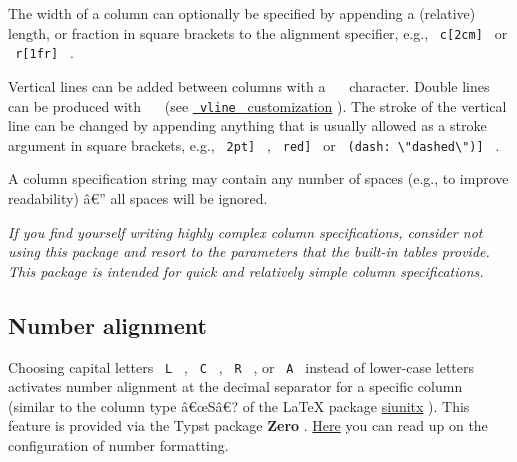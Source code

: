 The width of a column can optionally be specified by appending a
(relative) length, or fraction in square brackets to the alignment
specifier, e.g., \texttt{\ c{[}2cm{]}\ } or \texttt{\ r{[}1fr{]}\ } .

Vertical lines can be added between columns with a
\texttt{\ \textbar{}\ } character. Double lines can be produced with
\texttt{\ \textbar{}\textbar{}\ } (see
\href{https://github.com/typst/packages/raw/main/packages/preview/pillar/0.2.0/\#vline-customization}{\texttt{\ vline\ }
customization} ). The stroke of the vertical line can be changed by
appending anything that is usually allowed as a stroke argument in
square brackets, e.g., \texttt{\ \textbar{}{[}2pt{]}\ } ,
\texttt{\ \textbar{}{[}red{]}\ } or
\texttt{\ \textbar{}{[}(dash:\ \textbackslash{}"dashed\textbackslash{}"){]}\ }
.

A column specification string may contain any number of spaces (e.g., to
improve readability) â€'' all spaces will be ignored.

\emph{If you find yourself writing highly complex column specifications,
consider not using this package and resort to the parameters that the
built-in tables provide. This package is intended for quick and
relatively simple column specifications.}

\subsection{Number alignment}\label{number-alignment}

Choosing capital letters \texttt{\ L\ } , \texttt{\ C\ } ,
\texttt{\ R\ } , or \texttt{\ A\ } instead of lower-case letters
activates number alignment at the decimal separator for a specific
column (similar to the column type â€œSâ€? of the LaTeX package
\href{https://github.com/josephwright/siunitx}{siunitx} ). This feature
is provided via the Typst package \textbf{Zero} .
\href{https://github.com/Mc-Zen/zero}{Here} you can read up on the
configuration of number formatting.

\begin{Shaded}
\begin{Highlighting}[]

\NormalTok{  [Measurement], [14525.278],   [1.41],    [1.47],    [1.5e{-}5],}
\NormalTok{  [Uncertainty], [2],           [0.3],     [0.3],     [4e{-}6],}
\NormalTok{  [Ref. [2]],    [14525,74856], [1.37316], [1.43777], [5.401e{-}6]}
\NormalTok{)}
\end{Highlighting}
\end{Shaded}

